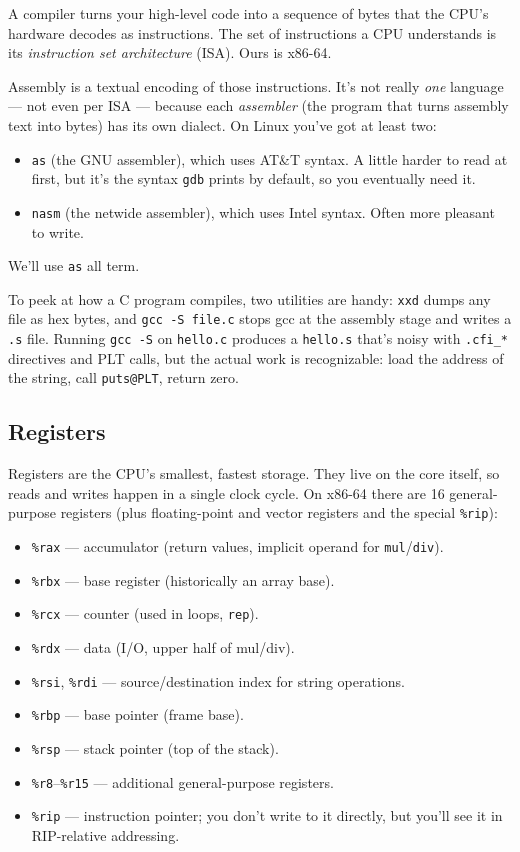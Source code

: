 \documentclass[11pt]{article}
\begin{document}
A compiler turns your high-level code into a sequence of bytes that
the CPU's hardware decodes as instructions. The set of instructions a
CPU understands is its \emph{instruction set architecture} (ISA).
Ours is x86-64.

Assembly is a textual encoding of those instructions. It's not really
\emph{one} language --- not even per ISA --- because each
\emph{assembler} (the program that turns assembly text into bytes) has
its own dialect. On Linux you've got at least two:
\begin{itemize}
  \item \texttt{as} (the GNU assembler), which uses AT\&T syntax. A
    little harder to read at first, but it's the syntax \texttt{gdb}
    prints by default, so you eventually need it.
  \item \texttt{nasm} (the netwide assembler), which uses Intel
    syntax. Often more pleasant to write.
\end{itemize}
We'll use \texttt{as} all term.

To peek at how a C program compiles, two utilities are handy:
\texttt{xxd} dumps any file as hex bytes, and \texttt{gcc -S file.c}
stops gcc at the assembly stage and writes a \texttt{.s} file. Running
\texttt{gcc -S} on \texttt{hello.c} produces a \texttt{hello.s} that's
noisy with \texttt{.cfi\_*} directives and PLT calls, but the actual
work is recognizable: load the address of the string, call
\texttt{puts@PLT}, return zero.

\subsection*{Registers}

Registers are the CPU's smallest, fastest storage. They live on the
core itself, so reads and writes happen in a single clock cycle. On
x86-64 there are 16 general-purpose registers (plus floating-point and
vector registers and the special \texttt{\%rip}):
\begin{itemize}
  \item \texttt{\%rax} --- accumulator (return values, implicit
    operand for \texttt{mul}/\texttt{div}).
  \item \texttt{\%rbx} --- base register (historically an array base).
  \item \texttt{\%rcx} --- counter (used in loops, \texttt{rep}).
  \item \texttt{\%rdx} --- data (I/O, upper half of mul/div).
  \item \texttt{\%rsi}, \texttt{\%rdi} --- source/destination index
    for string operations.
  \item \texttt{\%rbp} --- base pointer (frame base).
  \item \texttt{\%rsp} --- stack pointer (top of the stack).
  \item \texttt{\%r8}--\texttt{\%r15} --- additional general-purpose
    registers.
  \item \texttt{\%rip} --- instruction pointer; you don't write to it
    directly, but you'll see it in RIP-relative addressing.
\end{itemize}
\end{document}
